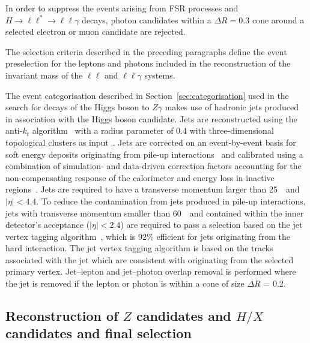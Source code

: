 In order to suppress the events arising from FSR processes 
and $H\to\ell\ell^*\to\ell\ell\gamma$ decays,
photon candidates within a $\Delta R = 0.3$ cone around a selected
electron or muon candidate are rejected.

The selection
criteria described in the preceding paragraphs
define the event preselection for the leptons and photons included
in the reconstruction of the
invariant mass of the $\ell\ell$ and $\ell\ell\gamma$ systems.

The event categorisation described in Section~\ref{sec:categorisation} used in the 
search for decays of the Higgs boson to $Z\gamma$
makes use of hadronic jets produced in association with the Higgs boson 
candidate.
Jets are reconstructed using the anti-$k_t$ algorithm~\cite{Cacciari:2008gp} with a radius parameter of
0.4 with three-dimensional topological clusters as input~\cite{Aad:2016upy}. Jets are corrected on an event-by-event
basis for soft energy deposits originating from pile-up interactions~\cite{ATLAS-jetpucorr} and 
calibrated using a combination of simulation- and data-driven correction factors accounting
for the non-compensating response of the calorimeter and energy loss in inactive regions~\cite{Aaboud:2017jcu}.
Jets are required to have a transverse momentum larger than 25~\GeV\ and $|\eta|<4.4$. 
To reduce the contamination from jets produced in pile-up interactions, jets with transverse momentum smaller 
than 60~\GeV\ and contained within the inner detector's acceptance ($|\eta|<2.4$) are required to
pass a selection based on the jet vertex tagging algorithm~\cite{ATLAS-JVT}, which is 92\% efficient
for jets originating from the hard interaction. The jet vertex tagging algorithm is 
based on the tracks associated with the jet which are consistent with originating from the selected primary vertex.
Jet--lepton and jet--photon overlap removal is performed where the jet is removed if the lepton or photon is 
within a cone of size $\Delta R$ = 0.2.


\subsection{Reconstruction of $Z$ candidates and $H/X$ candidates and final selection}
\label{sec:ZHXreco}

